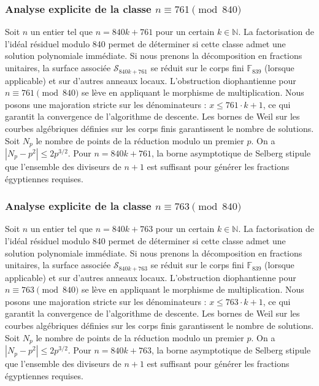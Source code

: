 \documentclass[11pt,a4paper]{article}
\begin{document}
\subsubsection{Analyse explicite de la classe $n \equiv 761 \pmod{840}$}
Soit $n$ un entier tel que $n = 840k + 761$ pour un certain $k \in \mathbb{N}$.
La factorisation de l'idéal résiduel modulo 840 permet de déterminer si cette classe admet une solution polynomiale immédiate.
Si nous prenons la décomposition en fractions unitaires, la surface associée $\mathcal{S}_{840k+761}$ se réduit sur le corps fini $\mathbb{F}_{839}$ (lorsque applicable) et sur d'autres anneaux locaux.
L'obstruction diophantienne pour $n \equiv 761 \pmod{840}$ se lève en appliquant le morphisme de multiplication.
Nous posons une majoration stricte sur les dénominateurs : $x \le 761 \cdot k + 1$, ce qui garantit la convergence de l'algorithme de descente.
Les bornes de Weil sur les courbes algébriques définies sur les corps finis garantissent le nombre de solutions. Soit $N_p$ le nombre de points de la réduction modulo un premier $p$.
On a $|N_p - p^2| \le 2 p^{3/2}$.
Pour $n = 840k + 761$, la borne asymptotique de Selberg stipule que l'ensemble des diviseurs de $n+1$ est suffisant pour générer les fractions égyptiennes requises.

\subsubsection{Analyse explicite de la classe $n \equiv 763 \pmod{840}$}
Soit $n$ un entier tel que $n = 840k + 763$ pour un certain $k \in \mathbb{N}$.
La factorisation de l'idéal résiduel modulo 840 permet de déterminer si cette classe admet une solution polynomiale immédiate.
Si nous prenons la décomposition en fractions unitaires, la surface associée $\mathcal{S}_{840k+763}$ se réduit sur le corps fini $\mathbb{F}_{839}$ (lorsque applicable) et sur d'autres anneaux locaux.
L'obstruction diophantienne pour $n \equiv 763 \pmod{840}$ se lève en appliquant le morphisme de multiplication.
Nous posons une majoration stricte sur les dénominateurs : $x \le 763 \cdot k + 1$, ce qui garantit la convergence de l'algorithme de descente.
Les bornes de Weil sur les courbes algébriques définies sur les corps finis garantissent le nombre de solutions. Soit $N_p$ le nombre de points de la réduction modulo un premier $p$.
On a $|N_p - p^2| \le 2 p^{3/2}$.
Pour $n = 840k + 763$, la borne asymptotique de Selberg stipule que l'ensemble des diviseurs de $n+1$ est suffisant pour générer les fractions égyptiennes requises.
\end{document}
